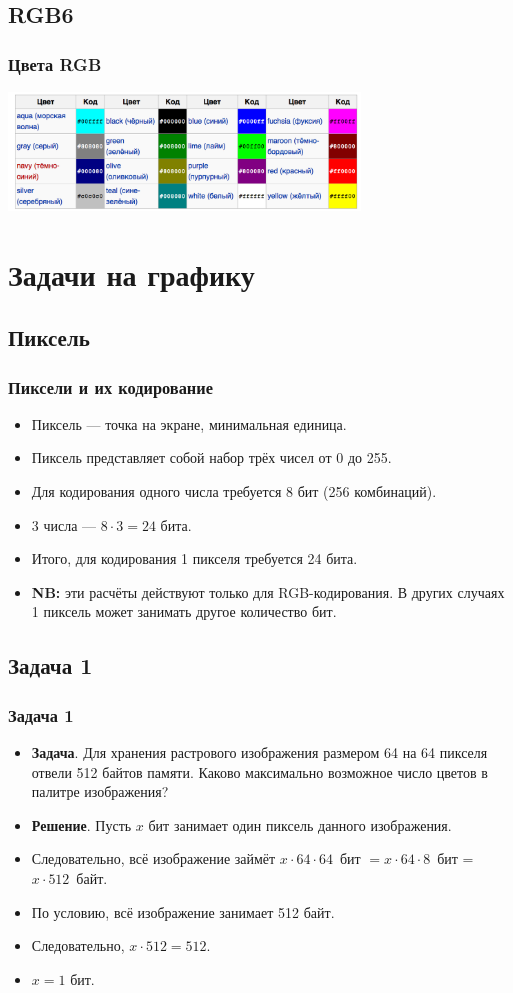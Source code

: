 \documentclass[compress,red]{beamer}
\begin{document}
\subsection{RGB6}
\begin{frame}[fragile]
  \frametitle{Цвета RGB}
  \centerline{\includegraphics[width=0.7\textwidth]{images/RGB_colors.png}}
\end{frame}

\section{Задачи на графику}
\subsection{Пиксель}
\begin{frame}[fragile]
  \frametitle{Пиксели и их кодирование}
  \begin{itemize}[<+->]
    \item Пиксель --- точка на экране, минимальная единица.
    \item Пиксель представляет собой набор трёх чисел от 0 до 255.
    \item Для кодирования одного числа требуется 8 бит (256 комбинаций).
    \item 3 числа --- $8\cdot 3 = 24$ бита.
    \item Итого, для кодирования 1 пикселя требуется 24 бита.
    \item \textbf{NB:} эти расчёты действуют только для RGB-кодирования. В других случаях 1 пиксель может занимать другое количество бит.
  \end{itemize}
\end{frame}

\subsection{Задача 1}
\begin{frame}[fragile]
  \frametitle{Задача 1}
  \begin{itemize}[<+->]
    \item \textbf{Задача}. Для хранения растрового изображения размером 64 на 64 пикселя отвели 512 байтов памяти. Каково максимально возможное число цветов в палитре изображения?
    \item \textbf{Решение}. Пусть $x$ бит занимает один пиксель данного изображения.
    \item Следовательно, всё изображение займёт $x\cdot 64\cdot 64$~бит $= x\cdot 64\cdot 8$~бит = $ x\cdot 512$~байт.
    \item По условию, всё изображение занимает 512 байт.
    \item Следовательно, $x\cdot 512 = 512$.
    \item $x = 1$ бит.
  \end{itemize}
\end{frame}
\end{document}
